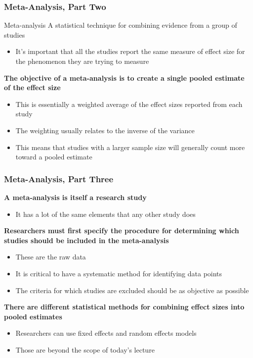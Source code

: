 \documentclass[10pt, block=fill]{beamer}
\begin{document}
\begin{frame}
    \frametitle{Meta-Analysis, Part Two}
    
    \begin{block}{Meta-analysis}
        A statistical technique for combining evidence from a group of studies
            \begin{itemize}
        \item It's important that all the studies report the same measure of effect size for the phenomenon they are trying to measure
    \end{itemize}
    \end{block}
    
    \vspace{0.25in}
    
    \textbf{The objective of a meta-analysis is to create a single pooled estimate of the effect size}
    \begin{itemize}
        \item This is essentially a weighted average of the effect sizes reported from each study
        \item The weighting usually relates to the inverse of the variance
        \item This means that studies with a larger sample size will generally count more toward a pooled estimate
    \end{itemize}
\end{frame}


\begin{frame}
    \frametitle{Meta-Analysis, Part Three}
    
    \textbf{A meta-analysis is itself a research study}\
    \begin{itemize}
        \item It has a lot of the same elements that any other study does
    \end{itemize}
    
    \textbf{Researchers must first specify the procedure for determining which studies should be included in the meta-analysis}
    \begin{itemize}
        \item These are the raw data
        \item It is critical to have a systematic method for identifying data points
        \item The criteria for which studies are excluded should be as objective as possible
    \end{itemize}
    
    \textbf{There are different statistical methods for combining effect sizes into pooled estimates}
    \begin{itemize}
        \item Researchers can use fixed effects and random effects models
        \item Those are beyond the scope of today's lecture
    \end{itemize}
\end{frame}
\end{document}
